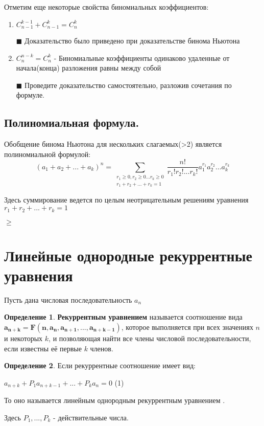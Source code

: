 \documentclass[12pt, a4paper, oneside]{article}
\theoremstyle{plain} %
\theoremstyle{definition}
\newtheorem*{definition}{Определение}  %
\newcommand{\indef}[1]{\textbf{ \color{dark_red} #1}}
\begin{document}
Отметим еще некоторые свойства биномиальных коэффициентов:

\begin{enumerate}

\item $C_{n-1}^{k-1} + C_{n-1}^{k} = C_{n}^{k} $

\(\blacksquare\) Доказательство было приведено при доказательстве бинома Ньютона%

\item $C_{n}^{n-k} = C_{n}^{k}$ - Биномиальные коэффициенты одинаково удаленные от начала(конца) разложения равны между собой

\(\blacksquare\) Проведите доказательство самостоятельно, разложив сочетания по формуле.

\end{enumerate}

\subsection{Полиномиальная формула.}

Обобщение бинома Ньютона для нескольких слагаемых(>2) является полиномиальной формулой:
\[
(a_1 + a_2 + ... + a_k)^n = \sum\limits_{\substack{r_1\geq 0,r_2\geq 0...r_k\geq 0 \\ r_1+r_2+...+r_k=1 }} \frac{n!}{r_1!r_2!...r_k!} a_1^{r_1} a_2^{r_2} \dotsc a_k^{r_k}
\]



Здесь суммирование ведется по целым неотрицательным решениям уравнения $r_1+r_2+...+r_k=1$ 

$\geq$

\section{Линейные однородные рекуррентные уравнения}

Пусть дана числовая последовательность $a_n$

\begin{definition}
\indef{Рекуррентным уравнением} называется соотношение вида $\mathbf{a_{n+k} = F(n,a_n,a_{n+1}, ..., a_{n+k-1})}$, которое выполняется при всех значениях $n$ и некоторых $k$, 
и позволяющая найти все члены числовой последовательности, если известны её первые $k$ членов.
\end{definition}
\begin{definition}
Если рекуррентные соотношение имеет вид:

$ a_{n+k} + P_1a_{n+k-1} + ... +P_ka_n = 0$ (1)%

То оно называется линейным однородным рекуррентным уравнением .

Здесь  $P_1,...,P_k$ - действительные числа.
\end{definition}
\end{document}
